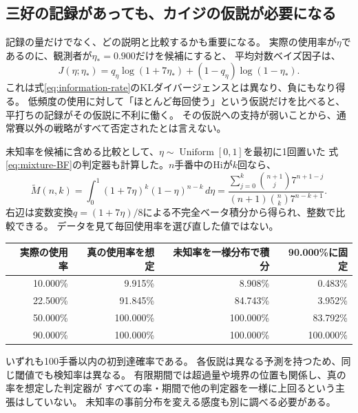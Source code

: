 \documentclass[11pt,a4paper]{article}
\numberwithin{equation}{section}
\begin{document}
\subsection{三好の記録があっても、カイジの仮説が必要になる}
記録の量だけでなく、どの説明と比較するかも重要になる。
実際の使用率が$\eta$であるのに、観測者が$\eta_*=0.900$だけを候補にすると、
平均対数ベイズ因子は、
\begin{equation}
J(\eta;\eta_*)=q_\eta\log(1+7\eta_*)+(1-q_\eta)\log(1-\eta_*).
\end{equation}
これは式\eqref{eq:information-rate}のKLダイバージェンスとは異なり、負にもなり得る。
低頻度の使用に対して「ほとんど毎回使う」という仮説だけを比べると、
平打ちの記録がその仮説に不利に働く。
その仮説への支持が弱いことから、通常賽以外の戦略がすべて否定されたとは言えない。

未知率を候補に含める比較として、$\eta\sim\operatorname{Uniform}[0,1]$を最初に1回置いた
式\eqref{eq:mixture-BF}の判定器も計算した。$n$手番中のHiが$k$回なら、
\begin{equation}
\widetilde M(n,k)=\int_0^1(1+7\eta)^k(1-\eta)^{n-k}\,d\eta
=\frac{\displaystyle\sum_{j=0}^{k}\binom{n+1}{j}7^{n+1-j}}
       {(n+1)\binom nk7^{n-k+1}}.
\label{eq:uniform-mixture}
\end{equation}
右辺は変数変換$q=(1+7\eta)/8$による不完全ベータ積分から得られ、整数で比較できる。
データを見て毎回使用率を選び直した値ではない。

\begin{center}
\small
\begin{tabular}{rrrr}
\toprule
実際の使用率&真の使用率を想定&未知率を一様分布で積分&90.000\%に固定\\
\midrule
10.000\%&9.915\%&8.908\%&0.483\%\\
22.500\%&91.845\%&84.743\%&3.952\%\\
50.000\%&100.000\%&100.000\%&83.792\%\\
90.000\%&100.000\%&100.000\%&100.000\%\\
\bottomrule
\end{tabular}
\end{center}
いずれも100手番以内の初到達確率である。
各仮説は異なる予測を持つため、同じ閾値でも検知率は異なる。
有限期間では超過量や境界の位置も関係し、真の率を想定した判定器が
すべての率・期間で他の判定器を一様に上回るという主張はしていない。
未知率の事前分布を変える感度も別に調べる必要がある。
\end{document}
